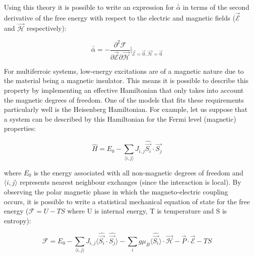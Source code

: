 \documentclass[10pt]{article}
\begin{document}
Using this theory it is possible to write an expression for $\bar{\bar{\alpha}}$ in terms of the second derivative of the free energy with respect to the electric and magnetic fields ($\vec{\mathcal{E}}$ and $\vec{\mathcal{H}}$ respectively):

\begin{equation*}
\bar{\bar{\alpha}} = -\frac{\partial^2 \mathcal{F}}{\partial \vec{\mathcal{E}}\partial\vec{\mathcal{H}}}\biggr\vert_{\vec{\mathcal{E}}=\vec{0}, \vec{\mathcal{H}} = \vec{0}}
\end{equation*}

For multiferroic systems, low-energy excitations are of a magnetic nature due to the material being a magnetic insulator. This means it is possible to describe this property by implementing an effective Hamiltonian that only takes into account the magnetic degrees of freedom. One of the models that fits these requirements particularly well is the Heisenberg Hamiltonian. For example, let us suppose that a system can be described by this Hamiltonian for the Fermi level (magnetic) properties:

\begin{equation}
\hat{H} = E_0 - \sum_{\langle i,j \rangle} J_{i,j}\hat{\vec{S_i}}\cdot \hat{\vec{S_j}}
\end{equation}

where $E_0$ is the energy associated with all non-magnetic degrees of freedom and $\langle i,j \rangle$ represents nearest neighbour exchanges (since the interaction is local). By observing the polar magnetic phase in which the magneto-electric coupling occurs, it is possible to write a statistical mechanical equation of state for the free energy ($\mathcal{F} = U - TS$ where U is internal energy, T is temperature and S is entropy):

\begin{equation*}
\mathcal{F} = E_0 - \sum_{\langle i,j \rangle} J_{i,j}\langle \hat{\vec{S_i}}\cdot \hat{\vec{S_j}} \rangle - \sum_{i}g\mu_{B}\langle \hat{\vec{S_i}}\rangle \cdot \mathcal{\vec{H}} - \vec{P}\cdot \mathcal{\vec{E}} - TS
\end{equation*}
\end{document}
